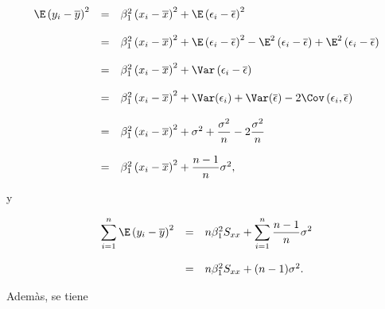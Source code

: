 $$
\begin{array}{rcl}
    \E\left(y_i-\overline{y}\right)^2 &=& \beta_1^2\left(x_i-\overline{x}\right)^2+\E\left(\epsilon_i-\overline{\epsilon}\right)^2\\\\
				      &=& \beta_1^2\left(x_i-\overline{x}\right)^2 + \E\left(\epsilon_i-\overline{\epsilon}\right)^2 - \E^2\left(\epsilon_i-\overline{\epsilon}\right) + \E^2\left(\epsilon_i-\overline{\epsilon}\right)\\\\
				      &=& \beta_1^2\left(x_i-\overline{x}\right)^2 + \Var\left(\epsilon_i-\overline{\epsilon}\right)\\\\
				      &=& \beta_1^2\left(x_i-\overline{x}\right)^2 + \Var(\epsilon_i)+\Var(\overline{\epsilon})-2\Cov\left(\epsilon_i,\overline{\epsilon}\right)\\\\
				      &=& \beta_1^2\left(x_i-\overline{x}\right)^2 + \sigma^2+\dfrac{\sigma^2}{n}-2\dfrac{\sigma^2}{n}\\\\
				      &=& \beta_1^2\left(x_i-\overline{x}\right)^2+\dfrac{n-1}{n}\sigma^2,
\end{array}
$$

y

$$
\begin{array}{rcl}
    \displaystyle\sum_{i=1}^n \E\left(y_i-\overline{y}\right)^2 &=& n\beta_1^2 S_{xx} + \displaystyle\sum_{i=1}^n \dfrac{n-1}{n}\sigma^2\\\\
								&=& n\beta_1^2 S_{xx}+(n-1)\sigma^2.
\end{array}
$$

Ademàs, se tiene

